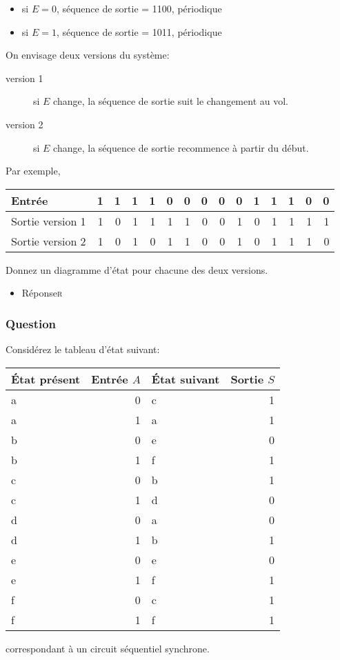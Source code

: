 \documentclass[11pt]{article}
\begin{document}
\begin{itemize}
\item si \(E=0\), séquence de sortie = 1100, périodique

\item si \(E=1\), séquence de sortie = 1011, périodique
\end{itemize}

On envisage deux versions du système:

\begin{description}
\item[{version 1}] si  \(E\) change, la séquence de sortie suit le
changement au vol.

\item[{version 2}] si \(E\) change, la séquence de sortie recommence à
partir du début.
\end{description}

Par exemple,
\begin{center}
\begin{tabular}{lrrrrrrrrrrrrrr}
Entrée & 1 & 1 & 1 & 1 & 0 & 0 & 0 & 0 & 0 & 1 & 1 & 1 & 0 & 0\\
\hline
Sortie version 1 & 1 & 0 & 1 & 1 & 1 & 1 & 0 & 0 & 1 & 0 & 1 & 1 & 1 & 1\\
Sortie version 2 & 1 & 0 & 1 & 0 & 1 & 1 & 0 & 0 & 1 & 0 & 1 & 1 & 1 & 0\\
\end{tabular}
\end{center}

Donnez un diagramme d'état pour chacune des deux versions.

\begin{itemize}
\item Réponse\hfill{}\textsc{r}
\label{sec:orgc67828c}
\end{itemize}

\subsubsection*{Question}
\label{sec:orgbb225a9}
Considérez le tableau d'état suivant:
\begin{center}
\begin{tabular}{lrlr}
État présent & Entrée \(A\) & État suivant & Sortie \(S\)\\
\hline
a & 0 & c & 1\\
a & 1 & a & 1\\
b & 0 & e & 0\\
b & 1 & f & 1\\
c & 0 & b & 1\\
c & 1 & d & 0\\
d & 0 & a & 0\\
d & 1 & b & 1\\
e & 0 & e & 0\\
e & 1 & f & 1\\
f & 0 & c & 1\\
f & 1 & f & 1\\
\end{tabular}
\end{center}
correspondant à un circuit séquentiel synchrone.
\end{document}
